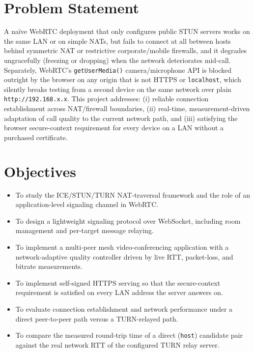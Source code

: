 \documentclass[12pt,a4paper]{report}
\begin{document}
\section{Problem Statement}
A na\"ive WebRTC deployment that only configures public STUN servers works on the same LAN
or on simple NATs, but fails to connect at all between hosts behind symmetric NAT or
restrictive corporate/mobile firewalls, and it degrades ungracefully (freezing or dropping)
when the network deteriorates mid-call. Separately, WebRTC's \texttt{getUserMedia()} camera/microphone
API is blocked outright by the browser on any origin that is not HTTPS or
\texttt{localhost}, which silently breaks testing from a second device on the same network
over plain \texttt{http://192.168.x.x}. This project addresses: (i) reliable connection
establishment across NAT/firewall boundaries, (ii) real-time, measurement-driven adaptation
of call quality to the current network path, and (iii) satisfying the browser secure-context
requirement for every device on a LAN without a purchased certificate.

\section{Objectives}
\begin{itemize}[nosep]
  \item To study the ICE/STUN/TURN NAT-traversal framework and the role of an
  application-level signaling channel in WebRTC.
  \item To design a lightweight signaling protocol over WebSocket, including room
  management and per-target message relaying.
  \item To implement a multi-peer mesh video-conferencing application with a network-adaptive
  quality controller driven by live RTT, packet-loss, and bitrate measurements.
  \item To implement self-signed HTTPS serving so that the secure-context requirement is
  satisfied on every LAN address the server answers on.
  \item To evaluate connection establishment and network performance under a direct
  peer-to-peer path versus a TURN-relayed path.
  \item To compare the measured round-trip time of a direct (\texttt{host}) candidate pair
  against the real network RTT of the configured TURN relay server.
\end{itemize}
\end{document}
